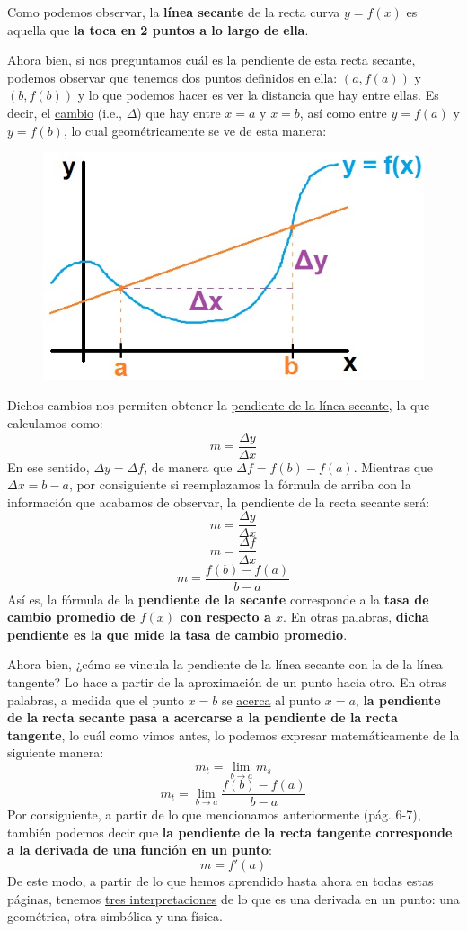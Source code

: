\documentclass[12pt]{article}
\begin{document}
Como podemos observar, la \textbf{línea secante} de la recta curva $y = f(x)$ es aquella que \textbf{la toca en 2 puntos a lo largo de ella}.

Ahora bien, si nos preguntamos cuál es la pendiente de esta recta secante, podemos observar que tenemos dos puntos definidos en ella: $(a, f(a))$ y $(b, f(b))$ y lo que podemos hacer es ver la distancia que hay entre ellas. Es decir, el \underline{cambio} (i.e., $\Delta$) que hay entre $x = a$ y $x = b$, así como entre $y = f(a)$ y $y = f(b)$, lo cual geométricamente se ve de esta manera:

\begin{figure}[hbt!]
\centering
\includegraphics[scale=0.7]{img/secant_line_intro_2.jpg}
\end{figure}

\newpage

Dichos cambios nos permiten obtener la \underline{pendiente de la línea secante}, la que calculamos como:
\[m = \frac{\Delta y}{\Delta x}\]
En ese sentido, $\Delta y = \Delta f$, de manera que $\Delta f = f(b)-f(a)$. Mientras que $\Delta x = b - a$, por consiguiente si reemplazamos la fórmula de arriba con la información que acabamos de observar, la pendiente de la recta secante será:
\[m = \frac{\Delta y}{\Delta x}\]
\[m = \frac{\Delta f}{\Delta x}\]
\[m = \frac{f(b)-f(a)}{b-a}\]
Así es, la fórmula de la \textbf{pendiente de la secante} corresponde a la \textbf{tasa de cambio promedio de $f(x)$ con respecto a $x$}. En otras palabras, \textbf{dicha pendiente es la que mide la tasa de cambio promedio}.

Ahora bien, ¿cómo se vincula la pendiente de la línea secante con la de la línea tangente? Lo hace a partir de la aproximación de un punto hacia otro. En otras palabras, a medida que el punto $x = b$ se \underline{acerca} al punto $x = a$, \textbf{la pendiente de la recta secante pasa a acercarse a la pendiente de la recta tangente}, lo cuál como vimos antes, lo podemos expresar matemáticamente de la siguiente manera:
\[m_{t} = \lim_{b \to a} m_{s}\]
\[m_{t} = \lim_{b \to a} \frac{f(b)-f(a)}{b-a}\]
Por consiguiente, a partir de lo que mencionamos anteriormente (pág. 6-7), también podemos decir que \textbf{la pendiente de la recta tangente corresponde a la derivada de una función en un punto}:
\[m = f'(a)\]
De este modo, a partir de lo que hemos aprendido hasta ahora en todas estas páginas, tenemos \underline{tres interpretaciones} de lo que es una derivada en un punto: una geométrica, otra simbólica y una física.
\end{document}
